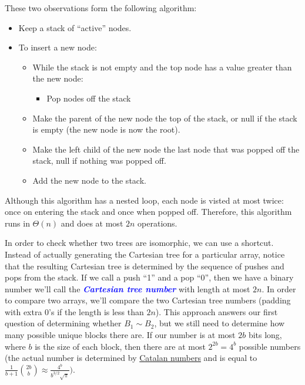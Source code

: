 \documentclass[11pt, oneside]{article}
\newcommand{\emphasis}[1]{\textcolor{blue}{\textbf{\textit{#1}}}}
\begin{document}
These two observations form the following algorithm:
\begin{itemize}
  \item Keep a stack of ``active'' nodes.
  \item To insert a new node:
    \begin{itemize}
      \item While the stack is not empty and the top node has a value greater than the new node:
      \begin{itemize}
        \item Pop nodes off the stack
      \end{itemize}
      \item Make the parent of the new node the top of the stack, or null
      if the stack is empty (the new node is now the root).
      \item Make the left child of the new node the last node that was popped off the stack,
      null if nothing was popped off.
      \item Add the new node to the stack.
    \end{itemize}
\end{itemize}

Although this algorithm has a nested loop, each node is visted at most twice:
once on entering the stack and once when popped off. Therefore, this algorithm
runs in \( \Theta(n) \) and does at most \( 2n \) operations.

In order to check whether two trees are isomorphic, we can use a shortcut.
Instead of actually generating the Cartesian tree for a particular array, notice that
the resulting Cartesian tree is determined by the sequence of pushes and pops from the stack.
If we call a push ``1'' and a pop ``0'', then we have a binary number we'll call the
\emphasis{Cartesian tree number} with length at most \( 2n \). In order to compare two arrays,
we'll compare the two Cartesian tree numbers (padding with extra 0's if the length is less than \( 2n \)).
This approach answers our first question of determining whether \( B_1 \sim B_2 \), but
we still need to determine how many possible unique blocks there are. If our number is at most \( 2b \) bits long,
where \( b \) is the size of each block, then there are at most \(2^{2b} = 4^b \) possible numbers
(the actual number is determined by \href{https://en.wikipedia.org/wiki/Catalan_number}{Catalan numbers}
and is equal to \( \frac{1}{b + 1} \binom{2b}{b} \approx \frac{4^b}{b^{3/2}\sqrt{\pi}}) \).

\newpage
\end{document}

